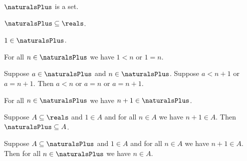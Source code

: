 \begin{signature} \label{sig2}
    $\naturalsPlus$ is a set.
\end{signature}

\begin{axiom}\label{real_naturals_subset_reals}
    $\naturalsPlus \subseteq \reals$.
\end{axiom}

\begin{axiom}\label{real_one_in_naturals}
    $1\in\naturalsPlus$.
\end{axiom}


\begin{axiom}\label{real_one_leq_naturalsplus}
    For all $n\in\naturalsPlus$ we have $1 < n$ or $1 = n$.
\end{axiom}

\begin{axiom}\label{real_succ_discrete}
    Suppose $a\in\naturalsPlus$ and $n\in\naturalsPlus$.
    Suppose $a < n + 1$ or $a = n + 1$.
    Then $a < n$ or $a = n$ or $a = n + 1$.
\end{axiom}

\begin{axiom}\label{real_naturals_closed_succ}
    For all $n\in\naturalsPlus$ we have $n + 1\in\naturalsPlus$.
\end{axiom} 

\begin{axiom}\label{real_naturals_smallest}
    Suppose $A\subseteq\reals$ and $1\in A$ and for all $n\in A$ we have $n + 1\in A$.
    Then $\naturalsPlus \subseteq A$.
\end{axiom}

\begin{proposition}\label{real_naturals_induction}
    Suppose $A\subseteq\naturalsPlus$ and $1\in A$ and for all $n\in A$ we have $n + 1\in A$.
    Then for all $n\in\naturalsPlus$ we have $n\in A$.
\end{proposition}


 
